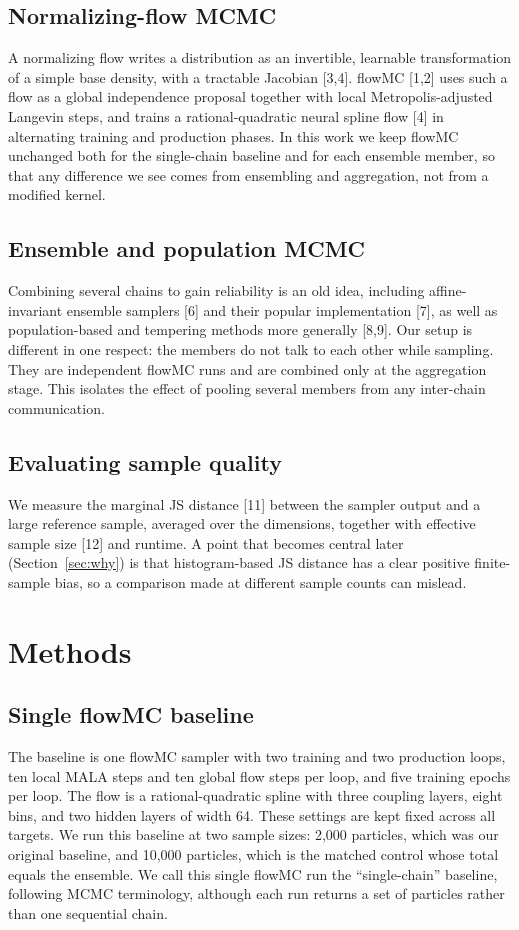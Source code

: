 \documentclass[11pt]{article}
\begin{document}
\subsection{Normalizing-flow MCMC}
A normalizing flow writes a distribution as an invertible, learnable
transformation of a simple base density, with a tractable Jacobian [3,4].
flowMC [1,2] uses such a flow as a global independence proposal together with
local Metropolis-adjusted Langevin steps, and trains a rational-quadratic
neural spline flow [4] in alternating training and production phases. In this
work we keep flowMC unchanged both for the single-chain baseline and for each
ensemble member, so that any difference we see comes from ensembling and
aggregation, not from a modified kernel.

\subsection{Ensemble and population MCMC}
Combining several chains to gain reliability is an old idea, including
affine-invariant ensemble samplers [6] and their popular implementation [7],
as well as population-based and tempering methods more generally [8,9]. Our setup is different
in one respect: the members do not talk to each other while sampling. They are
independent flowMC runs and are combined only at the aggregation stage. This
isolates the effect of pooling several members from any inter-chain
communication.

\subsection{Evaluating sample quality}
We measure the marginal JS distance [11] between the sampler output and a
large reference sample, averaged over the dimensions, together with effective
sample size [12] and runtime. A point that becomes central later
(Section~\ref{sec:why}) is that histogram-based JS distance has a clear
positive finite-sample bias, so a comparison made at different sample counts
can mislead.

\section{Methods}

\subsection{Single flowMC baseline}
The baseline is one flowMC sampler with two training and two production loops,
ten local MALA steps and ten global flow steps per loop, and five training
epochs per loop. The flow is a rational-quadratic spline with three coupling
layers, eight bins, and two hidden layers of width 64. These settings are kept
fixed across all targets. We run this baseline at two sample sizes: 2,000
particles, which was our original baseline, and 10,000 particles, which is the
matched control whose total equals the ensemble. We call this single flowMC run the ``single-chain'' baseline, following MCMC terminology, although each run returns a set of particles rather than one sequential chain.
\end{document}

